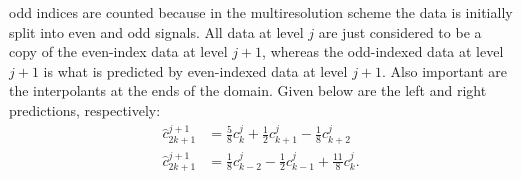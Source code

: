 \documentclass[12pt,letterpaper]{article}
\begin{document}
odd indices are counted because in the multiresolution scheme the
data is initially split into even
and odd signals. All data at level $j$ are just considered to
be a copy of the even-index data at level $j+1$, whereas
the odd-indexed data at level $j+1$ is what is predicted
by even-indexed data at level $j+1$. Also important are the
interpolants at the ends of the domain. Given below are the
left and right predictions, respectively:
\begin{align}
	\hat{c}^{j+1}_{2k+1} & = \frac{5}{8} c^{j}_{k}
	+ \frac{1}{2} c^{j}_{k+1} - \frac{1}{8} c^{j}_{k+2} \\
	\hat{c}^{j+1}_{2k+1} & = \frac{1}{8} c^{j}_{k-2}
	- \frac{1}{2} c^{j}_{k-1} + \frac{11}{8} c^{j}_{k}.
\end{align}

  

\end{document}
